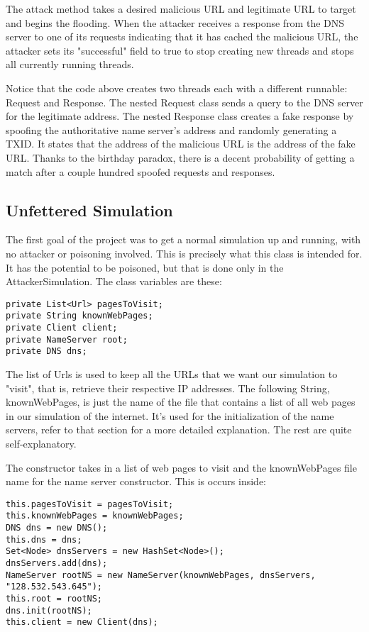 \documentclass[a4paper, 12pt]{article} %
\begin{document}
The attack method takes a desired malicious URL and legitimate URL to target and begins the flooding. When the attacker receives a response from the DNS server to one of its requests indicating that it has cached the malicious URL, the attacker sets its "successful" field to true to stop creating new threads and stops all currently running threads.

Notice that the code above creates two threads each with a different runnable: Request and Response. The nested Request class sends a query to the DNS server for the legitimate address. The nested Response class creates a fake response by spoofing the authoritative name server's address and randomly generating a TXID. It states that the address of the malicious URL is the address of the fake URL. Thanks to the birthday paradox, there is a decent probability of getting a match after a couple hundred spoofed requests and responses.

\subsection*{Unfettered Simulation}

The first goal of the project was to get a normal simulation up and running, with no attacker or poisoning involved. This is precisely what this class is intended for. It has the potential to be poisoned, but that is done only in the AttackerSimulation. The class variables are these:

\begin{lstlisting}
private List<Url> pagesToVisit;
private String knownWebPages;
private Client client;
private NameServer root;
private DNS dns;
\end{lstlisting}

The list of Urls is used to keep all the URLs that we want our simulation to "visit", that is, retrieve their respective IP addresses. The following String, knownWebPages, is just the name of the file that contains a list of all web pages in our simulation of the internet. It's used for the initialization of the name servers, refer to that section for a more detailed explanation. The rest are quite self-explanatory.

The constructor takes in a list of web pages to visit and the knownWebPages file name for the name server constructor. This is occurs inside:
\begin{lstlisting}
this.pagesToVisit = pagesToVisit;
this.knownWebPages = knownWebPages;
DNS dns = new DNS();
this.dns = dns;
Set<Node> dnsServers = new HashSet<Node>();
dnsServers.add(dns);
NameServer rootNS = new NameServer(knownWebPages, dnsServers, "128.532.543.645");
this.root = rootNS;
dns.init(rootNS);
this.client = new Client(dns);
\end{lstlisting}
\end{document}
